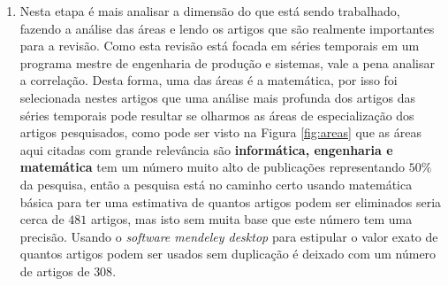 \begin{enumerate}[start=1, label = {\textbf{Etapa} \arabic* } ]
	\item  \label{etp:rev-4}Nesta etapa é mais analisar a dimensão do que está sendo trabalhado, fazendo a análise das áreas e lendo os artigos que são realmente importantes para a revisão. Como esta revisão está focada em séries temporais em um programa mestre de engenharia de produção e sistemas, vale a pena analisar a correlação. Desta forma, uma das áreas é a matemática, por isso foi selecionada nestes artigos que uma análise mais profunda dos artigos das séries temporais pode resultar se olharmos as áreas de especialização dos artigos pesquisados, como pode ser visto na Figura \ref{fig:areas} que as áreas aqui citadas com grande relevância são \textbf{informática, engenharia e matemática} tem um número muito alto de publicações representando $50\%$ da pesquisa, então a pesquisa está no caminho certo usando matemática básica para ter uma estimativa de quantos artigos podem ser eliminados seria cerca de $481$ artigos, mas isto sem muita base que este número tem uma precisão. Usando o \textit{software mendeley desktop} para estipular o valor exato de quantos artigos podem ser usados sem duplicação é deixado com um número de artigos de $308$.
\end{enumerate}